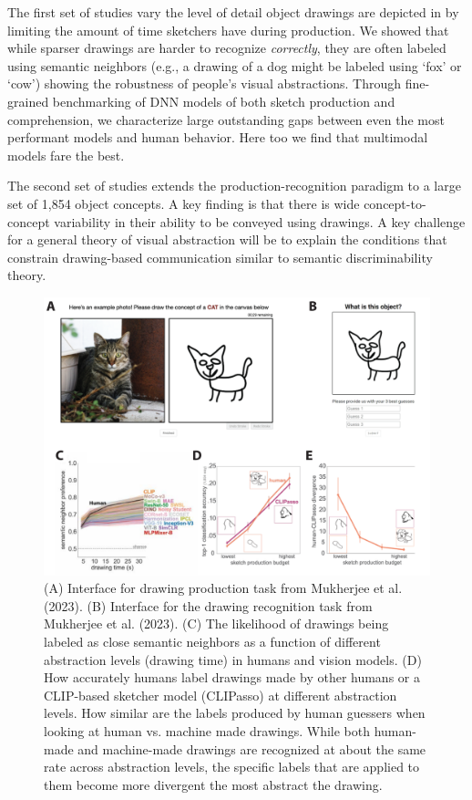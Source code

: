 \documentclass{Dissertate}
\begin{document}
The first set of studies vary the level of detail object drawings are depicted in by limiting the amount of time sketchers have during production.
We showed that while sparser drawings are harder to recognize \textit{correctly}, they are often labeled using semantic neighbors (e.g., a drawing of a dog might be labeled using `fox' or `cow') showing the robustness of people's visual abstractions.
Through fine-grained benchmarking of DNN models of both sketch production and comprehension, we characterize large outstanding gaps between even the most performant models and human behavior.
Here too we find that multimodal models fare the best.

The second set of studies extends the production-recognition paradigm to a large set of 1,854 object concepts.
A key finding is that there is wide concept-to-concept variability in their ability to be conveyed using drawings.
A key challenge for a general theory of visual abstraction will be to explain the conditions that constrain drawing-based communication similar to semantic discriminability theory.


\begin{figure}[htpb!]
    \centering
    \includegraphics[width=.8\linewidth]{proposal/figures/chap4.pdf}
    \caption{(A) Interface for drawing production task from Mukherjee et al. (2023). (B) Interface for the drawing recognition task from Mukherjee et al. (2023). (C) The likelihood of drawings being labeled as close semantic neighbors as a function of different abstraction levels (drawing time) in humans and vision models. (D) How accurately humans label drawings made by other humans or a CLIP-based sketcher model (CLIPasso) at different abstraction levels. How similar are the labels produced by human guessers when looking at human vs. machine made drawings. While both human-made and machine-made drawings are recognized at about the same rate across abstraction levels, the specific labels that are applied to them become more divergent the most abstract the drawing.}
    \label{fig:chap4}
\end{figure}
\end{document}
